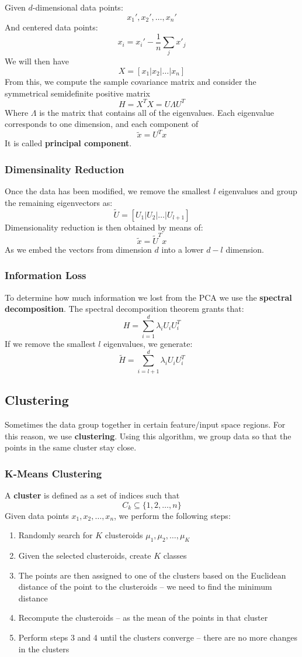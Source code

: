 \documentclass{article}
\begin{document}
\noindent Given $d$-dimensional data points:
\[ x_1', x_2', \dots, x_n' \]
And centered data points:
\[ x_i = x_i' - \frac{1}{n} \sum_j x'_j \]
We will then have
\[ X = [x_1 | x_2 | \dots | x_n] \]
From this, we compute the sample covariance matrix and consider the symmetrical semidefinite positive matrix
\[ H = X^TX = U\Lambda U^T \]
Where $\Lambda$ is the matrix that contains all of the eigenvalues. Each eigenvalue corresponds to one dimension, and each component of
\[ \tilde x = U^Tx \]
It is called \textbf{principal component}.

\subsubsection{Dimensinality Reduction}
Once the data has been modified, we remove the smallest $l$ eigenvalues and group the remaining eigenvectors as:
\[ \tilde U = [ U_1 | U_2 | \dots | U_{l+1} ] \]
Dimensionality reduction is then obtained by means of:
\[ \tilde x = \tilde U^T x \]
As we embed the vectors from dimension $d$ into a lower $d-l$ dimension.

\subsubsection{Information Loss}
To determine how much information we lost from the PCA we use the \textbf{spectral decomposition}. The spectral decomposition theorem grants that:
\[ H = \sum^d_{i=1} \lambda_iU_iU_i^T \]
If we remove the smallest $l$ eigenvalues, we generate:
\[ \tilde H = \sum^d_{i = l+1} \lambda_iU_iU_i^T \]

\subsection{Clustering}
Sometimes the data group together in certain feature/input space regions. For this reason, we use \textbf{clustering}. Using this algorithm, we group data so that the points in the same cluster stay close.

\subsubsection{K-Means Clustering}
A \textbf{cluster} is defined as a set of indices such that
\[ C_k \subseteq \{ 1, 2, \dots, n \} \]
Given data points $x_1, x_2, \dots, x_n$, we perform the following steps:

\begin{enumerate}
	\item Randomly search for $K$ clusteroids $\mu_1, \mu_2, \dots, \mu_K$
	\item Given the selected clusteroids, create $K$ classes
	\item The points are then assigned to one of the clusters based on the Euclidean distance of the point to the clusteroids -- we need to find the minimum distance
	\item Recompute the clusteroids -- as the mean of the points in that cluster
	\item Perform steps 3 and 4 until the clusters converge -- there are no more changes in the clusters
\end{enumerate}
\end{document}
